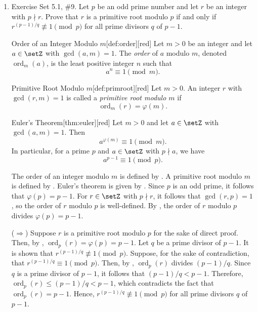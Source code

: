\newpage
\begin{enumerate}
  \item Exercise Set 5.1, \#9. Let $p$ be an odd prime number and let $r$ be an integer with $p \nmid r$. 
  Prove that $r$ is a primitive root modulo $p$ if and only if $r^{(p-1)/q} \not\equiv 1 \pmod{p}$ 
  for all prime divisors $q$ of $p-1$.
  \begin{define}{Order of an Integer Modulo $m$}[def:order][red]
  Let $m>0$ be an integer and let $a\in\setZ$ with $\gcd(a,m)=1$. The \emph{order} of $a$ modulo $m$, denoted $\operatorname{ord}_m(a)$, is the least positive integer $n$ such that
  \[
  a^n\equiv 1 \pmod m.
  \]
  \end{define}
  \begin{define}{Primitive Root Modulo $m$}[def:primroot][red]
  Let $m>0$. An integer $r$ with $\gcd(r,m)=1$ is called a \emph{primitive root modulo $m$} if
  \[
  \operatorname{ord}_m(r)=\varphi(m).
  \]
  \end{define}
  \begin{define}{Euler's Theorem}[thm:euler][red]
  Let $m>0$ and let $a\in\setZ$ with $\gcd(a,m)=1$. Then
  \[
  a^{\varphi(m)}\equiv 1 \pmod{m}.
  \]
  In particular, for a prime $p$ and $a\in\setZ$ with $p\nmid a$, we have
  \[
  a^{p-1}\equiv 1 \pmod{p}.
  \]
  \end{define}
  \begin{subprove}
    The order of an integer modulo $m$ is defined by .
    A primitive root modulo $m$ is defined by .
    Euler's theorem is given by .
    Since $p$ is an odd prime, it follows that $\varphi(p) = p-1$.
    For $r \in \setZ$ with $p \nmid r$, it follows that $\gcd(r, p) = 1$, so the order of $r$ modulo $p$ is well-defined.
    By , the order of $r$ modulo $p$ divides $\varphi(p) = p-1$.
    
    ($\Rightarrow$) Suppose $r$ is a primitive root modulo $p$ for the sake of direct proof.
    Then, by , $\operatorname{ord}_p(r) = \varphi(p) = p-1$.
    Let $q$ be a prime divisor of $p-1$. It is shown that $r^{(p-1)/q} \not\equiv 1 \pmod{p}$.
    Suppose, for the sake of contradiction, that $r^{(p-1)/q} \equiv 1 \pmod{p}$.
    Then, by , $\operatorname{ord}_p(r)$ divides $(p-1)/q$.
    Since $q$ is a prime divisor of $p-1$, it follows that $(p-1)/q < p-1$.
    Therefore, $\operatorname{ord}_p(r) \leq (p-1)/q < p-1$, which contradicts the fact that $\operatorname{ord}_p(r) = p-1$.
    Hence, $r^{(p-1)/q} \not\equiv 1 \pmod{p}$ for all prime divisors $q$ of $p-1$.
    

\end{subprove}
\end{enumerate}
